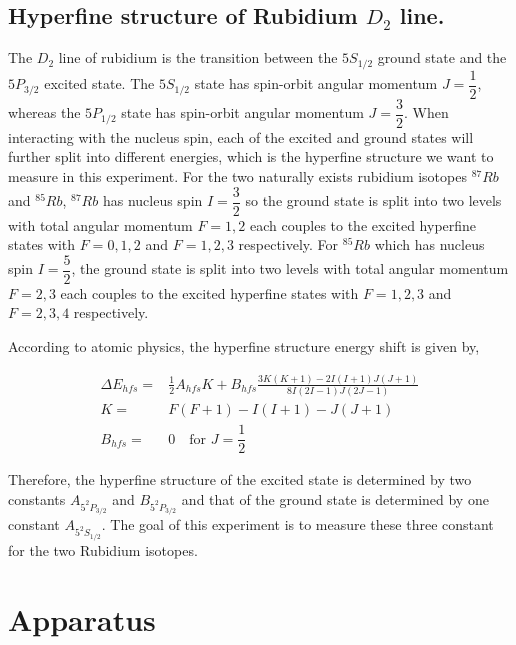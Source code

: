 \documentclass[aps,twocolumn,secnumarabic,balancelastpage,amsmath,amssymb,nofootinbib]{revtex4}
\newcommand{\eqar}[1]
{
  \begin{align*}
    #1
  \end{align*}
}
\begin{document}
\subsection{Hyperfine structure of Rubidium $D_2$ line.}
The $D_2$ line of rubidium is the transition between the $5S_{1/2}$ ground state and the $5P_{3/2}$ excited state. The $5S_{1/2}$ state has spin-orbit angular momentum $J=\dfrac12$, whereas the $5P_{1/2}$ state has spin-orbit angular momentum $J=\dfrac32$. When interacting with the nucleus spin, each of the excited and ground states will further split into different energies, which is the hyperfine structure we want to measure in this experiment. For the two naturally exists rubidium isotopes ${}^{87}Rb$ and ${}^{85}Rb$, ${}^{87}Rb$ has nucleus spin $I=\dfrac32$ so the ground state is split into two levels with total angular momentum $F=1,2$ each couples to the excited hyperfine states with $F=0,1,2$ and $F=1,2,3$ respectively. For ${}^{85}Rb$ which has nucleus spin $I=\dfrac52$, the ground state is split into two levels with total angular momentum $F=2,3$ each couples to the excited hyperfine states with $F=1,2,3$ and $F=2,3,4$ respectively.

According to atomic physics, the hyperfine structure energy shift is given by,
\eqar{
  \Delta E_{hfs}=&\frac12A_{hfs}K+B_{hfs}\frac{3K(K + 1) - 2I(I + 1)J(J + 1)}{8I(2I - 1)J(2J - 1)}\\
  K=&F(F + 1) - I(I + 1) - J(J + 1)\\
  B_{hfs}=&0\quad\text{for $J=\dfrac12$}
}
Therefore, the hyperfine structure of the excited state is determined by two constants $A_{5^2P_{3/2}}$ and $B_{5^2P_{3/2}}$ and that of the ground state is determined by one constant $A_{5^2S_{1/2}}$. The goal of this experiment is to measure these three constant for the two Rubidium isotopes.

\section{Apparatus}
\end{document}
